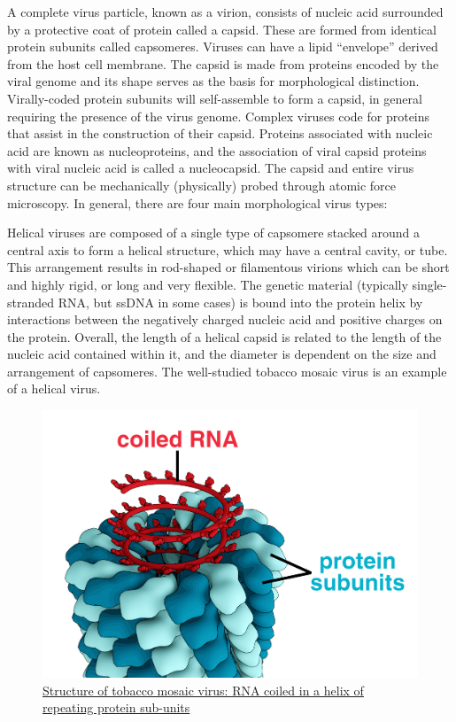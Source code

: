 A complete virus particle, known as a virion, consists of nucleic acid surrounded by a protective coat of protein called a capsid. These are formed from identical protein subunits called capsomeres. Viruses can have a lipid ``envelope'' derived from the host cell membrane. The capsid is made from proteins encoded by the viral genome and its shape serves as the basis for morphological distinction. Virally-coded protein subunits will self-assemble to form a capsid, in general requiring the presence of the virus genome. Complex viruses code for proteins that assist in the construction of their capsid. Proteins associated with nucleic acid are known as nucleoproteins, and the association of viral capsid proteins with viral nucleic acid is called a nucleocapsid. The capsid and entire virus structure can be mechanically (physically) probed through atomic force microscopy. In general, there are four main morphological virus types:

Helical viruses are composed of a single type of capsomere stacked around a central axis to form a helical structure, which may have a central cavity, or tube. This arrangement results in rod-shaped or filamentous virions which can be short and highly rigid, or long and very flexible. The genetic material (typically single-stranded RNA, but ssDNA in some cases) is bound into the protein helix by interactions between the negatively charged nucleic acid and positive charges on the protein. Overall, the length of a helical capsid is related to the length of the nucleic acid contained within it, and the diameter is dependent on the size and arrangement of capsomeres. The well-studied tobacco mosaic virus is an example of a helical virus.



\begin{figure}

{\centering \includegraphics[width=0.7\linewidth]{./figures/bacteria/TMV_structure_simple} 

}

\caption{\href{https://commons.wikimedia.org/wiki/File:TMV_structure_simple.png}{Structure of tobacco mosaic virus: RNA coiled in a helix of repeating protein sub-units}}\label{fig:tmvirus}
\end{figure}

